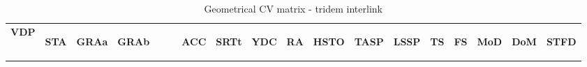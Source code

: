 \begin{table}[H]
\centering\scriptsize
\caption{Geometrical CV matrix - tridem interlink}   
\label{table:cv-geometrical-tridem-interlink}
\begin{tabular}{|l|c|c|c|c|c|c|c|c|c|c|c|c|c|c|c|}

\hline
\multicolumn{1}{|c|}{\textbf{VDP}} & \begin{sideways}\textbf{STA}\end{sideways} & \begin{sideways}\textbf{GRAa}\end{sideways} & \begin{sideways}\textbf{GRAb~~~~}\end{sideways} & \begin{sideways}\textbf{ACC}\end{sideways} & \begin{sideways}\textbf{SRTt}\end{sideways} & \begin{sideways}\textbf{YDC}\end{sideways} & \begin{sideways}\textbf{RA}\end{sideways} & \begin{sideways}\textbf{HSTO}\end{sideways} & \begin{sideways}\textbf{TASP}\end{sideways} & \begin{sideways}\textbf{LSSP}\end{sideways} & \begin{sideways}\textbf{TS}\end{sideways} & \begin{sideways}\textbf{FS}\end{sideways} & \begin{sideways}\textbf{MoD}\end{sideways} & \begin{sideways}\textbf{DoM}\end{sideways} & \begin{sideways}\textbf{STFD}\end{sideways} \bigstrut \\



\end{tabular}
\end{table}
